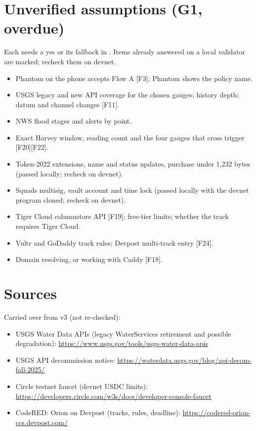 \documentclass[11pt]{article}
\newcommand{\code}[1]{\texttt{\detokenize{#1}}}
\newcommand{\cb}{$\square$\ }
\begin{document}
\section{Unverified assumptions (G1, overdue)}
Each needs a yes or its fallback in \code{docs/}\allowbreak\code{decisions.md}. Items already answered on a local validator are marked; recheck them on devnet.
\begin{itemize}[label=\cb]
\item Phantom on the phone accepts Flow A [F3]; Phantom shows the policy name.
\item USGS legacy and new API coverage for the chosen gauges; history depth; datum and channel changes [F11].
\item NWS flood stages and alerts by point.
\item Exact Harvey window, reading count and the four gauges that cross trigger [F20][F22].
\item Token-2022 extensions, name and status updates, purchase under 1,232 bytes (passed locally; recheck on devnet).
\item Squads multisig, vault account and time lock (passed locally with the devnet program cloned; recheck on devnet).
\item Tiger Cloud columnstore API [F19]; free-tier limits; whether the track requires Tiger Cloud.
\item Vultr and GoDaddy track rules; Devpost multi-track entry [F24].
\item Domain resolving, or \code{sslip.io} working with Caddy [F18].
\end{itemize}

\section*{Sources}
Carried over from v3 (not re-checked):
\begin{itemize}
\item USGS Water Data APIs (legacy WaterServices retirement and possible degradation): \url{https://www.usgs.gov/tools/usgs-water-data-apis}
\item USGS API decommission notice: \url{https://waterdata.usgs.gov/blog/api-decom-fall-2025/}
\item Circle testnet faucet (devnet USDC limits): \url{https://developers.circle.com/w3s/docs/developer-console-faucet}
\item CodeRED: Orion on Devpost (tracks, rules, deadline): \url{https://codered-orion-ccs.devpost.com/}
\end{itemize}
\end{document}

